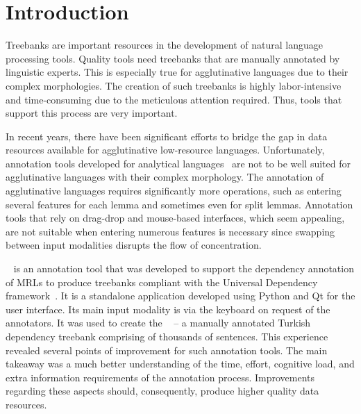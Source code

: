 \section{Introduction}
\label{sec:introduction}

Treebanks are important resources in the development of natural language processing tools.
Quality tools need treebanks that are manually annotated by linguistic experts. 
This is especially true for agglutinative languages due to their complex morphologies. 
The creation of such treebanks is highly labor-intensive and time-consuming due to the meticulous attention required.
Thus, tools that support this process are very important.

In recent years, there have been significant efforts to bridge the gap in data resources available for agglutinative low-resource languages.
Unfortunately, annotation tools developed for analytical languages~\cite{UD} are not to be well suited for agglutinative languages with their complex morphology.
The annotation of agglutinative  languages requires significantly more operations, such as entering several features for each lemma and sometimes even for split lemmas.
Annotation tools that rely on drag-drop and mouse-based interfaces, which seem appealing, are not suitable when entering numerous features is necessary since swapping between input modalities disrupts the flow of concentration.

\boatvone~\cite{turk2021resources} is an annotation tool that was developed to support the dependency annotation of MRLs to produce treebanks compliant with the Universal Dependency framework~\cite{UD}.
It is a standalone application developed using Python and Qt for the user interface.
Its main input modality is via the keyboard on request of the annotators. 
It was used to create the \bountreebank~\cite{turk-etal-2019-turkish,turk2021resources,UD-Boun-Treebank} -- a manually annotated Turkish dependency treebank comprising of thousands of sentences.
This experience revealed several points of improvement for such annotation tools.
The main takeaway was a much better understanding of the time, effort, cognitive load, and extra information requirements of the annotation process.
Improvements regarding these aspects should, consequently, produce higher quality data resources.

